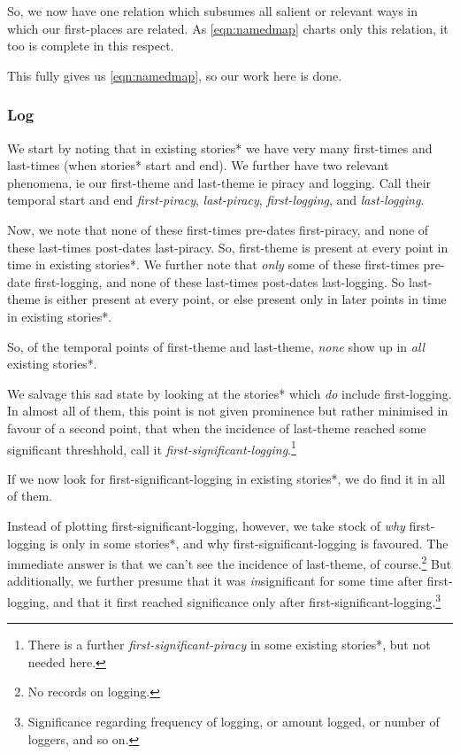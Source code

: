 \documentclass{amsart}
\newcommand{\mention}[1]{\textit{#1}} %
\theoremstyle{definition}
\theoremstyle{remark}
\begin{document}
			So, we now have one relation which subsumes all salient or relevant ways in which our first-places are related. As \ref{eqn:namedmap} charts only this relation, it too is complete in this respect.
			
			This fully gives us \ref{eqn:namedmap}, so our work here is done.
		\subsubsection{Log}
		\label{sss:log}
			We start by noting that in existing stories* we have very many first-times and last-times (when stories* start and end). We further have two relevant phenomena, ie our first-theme and last-theme ie piracy and logging. Call their temporal start and end \mention{first-piracy}, \mention{last-piracy}, \mention{first-logging}, and \mention{last-logging}.
			
			Now, we note that none of these first-times pre-dates first-piracy, and none of these last-times post-dates last-piracy. So, first-theme is present at every point in time in existing stories*. We further note that \emph{only} some of these first-times pre-date first-logging, and none of these last-times post-dates last-logging. So last-theme is either present at every point, or else present only in later points in time in existing stories*.
			
			So, of the temporal points of first-theme and last-theme, \emph{none} show up in \emph{all} existing stories*.
			
			We salvage this sad state by looking at the stories* which \emph{do} include first-logging. In almost all of them, this point is not given prominence but rather minimised in favour of a second point, that when the incidence of last-theme reached some significant threshhold, call it \mention{first-significant-logging}.\footnote{There is a further \mention{first-significant-piracy} in some existing stories*, but not needed here.}
			
			If we now look for first-significant-logging in existing stories*, we do find it in all of them.
			
			Instead of plotting first-significant-logging, however, we take stock of \emph{why} first-logging is only in some stories*, and why first-significant-logging is favoured. The immediate answer is that we can't see the incidence of last-theme, of course.\footnote{No records on logging.} But additionally, we further presume that it was \emph{in}significant for some time after first-logging, and that it first reached significance only after first-significant-logging.\footnote{Significance regarding frequency of logging, or amount logged, or number of loggers, and so on.}
			
\end{document}
